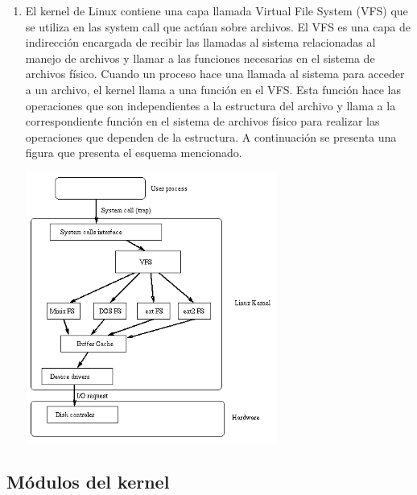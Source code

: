 \documentclass[a4paper,11pt] {article}
\begin{document}
\begin{enumerate}
\begin{enumerate}
			\item El kernel de Linux contiene una capa llamada Virtual File System (VFS) que se utiliza en las system call que actúan sobre archivos. El VFS es una capa de indirección encargada de recibir las llamadas al sistema relacionadas al manejo de archivos y llamar a las funciones necesarias en el sistema de archivos físico. 
			Cuando un proceso hace una llamada al sistema para acceder a un archivo, el kernel llama a una función en el VFS. Esta función hace las operaciones que son independientes a la estructura del archivo y llama a la correspondiente función en el sistema de archivos físico para realizar las operaciones que dependen de la estructura. A continuación se presenta una figura que presenta el esquema mencionado.
			\begin{center}
			\includegraphics[width=0.65\textwidth]{ext2-vfs.png}
			\end{center}

		\end{enumerate}

\end{enumerate}

\subsection*{Módulos del kernel}
\end{document}
